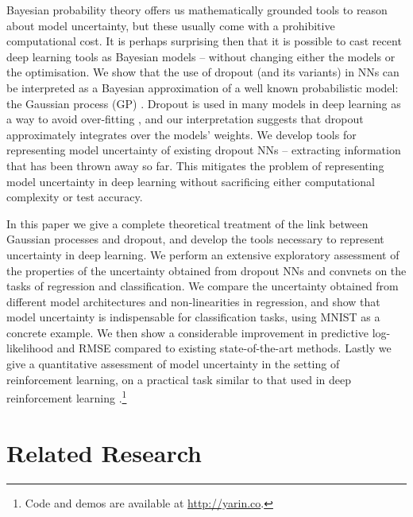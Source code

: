 \documentclass{article}
\theoremstyle{definition}
\begin{document}
Bayesian probability theory offers us mathematically grounded tools to reason about model uncertainty, but these usually come with a prohibitive computational cost. 
It is perhaps surprising then that it is possible to 
cast recent deep learning tools as Bayesian models -- without changing either the models or the optimisation. 
We show that the use of dropout (and its variants) in NNs can be interpreted as a Bayesian approximation of a well known probabilistic model: the Gaussian process (GP) \citep{Rasmussen2005Gaussian}. Dropout is used in many models in deep learning as a way to avoid over-fitting \citep{srivastava2014dropout}, and our interpretation suggests that dropout approximately integrates over the models' weights. We develop tools for representing model uncertainty of existing dropout NNs -- extracting information that has been thrown away so far. This mitigates the problem of representing model uncertainty in deep learning without sacrificing either computational complexity or test accuracy.

In this paper we give a complete theoretical treatment of the link between Gaussian processes and dropout, and develop the tools necessary to represent uncertainty in deep learning. 
We perform an extensive exploratory assessment of the properties of the uncertainty obtained from dropout NNs and convnets on the tasks of regression and classification. We compare the uncertainty obtained from different model architectures and non-linearities in regression, and show that model uncertainty is indispensable for classification tasks, using MNIST as a concrete example. 
We then show a considerable improvement in predictive log-likelihood and RMSE compared to existing state-of-the-art methods.
Lastly we give a quantitative assessment of model uncertainty in the setting of reinforcement learning, on a practical task similar to that used in deep reinforcement learning \citep{mnih2015human}.\footnote{Code and demos are available at \url{http://yarin.co}.}

\section{Related Research}
\end{document}
